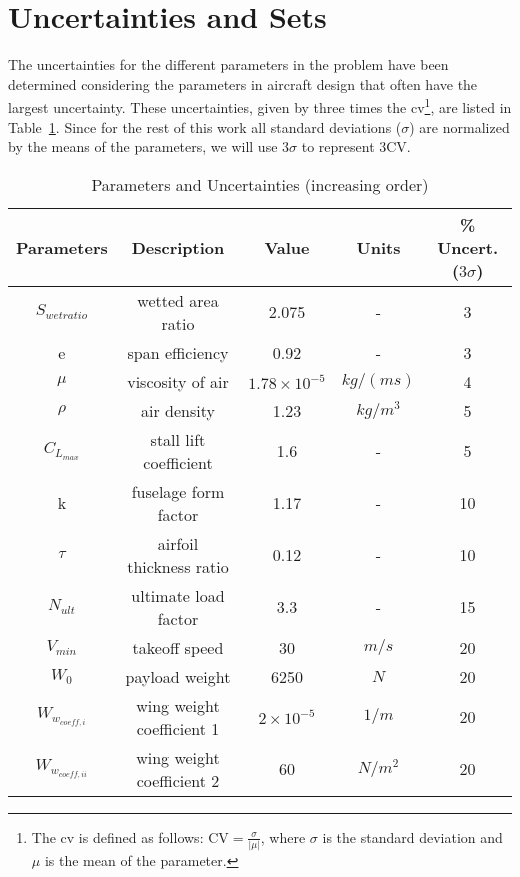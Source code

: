 \section{Uncertainties and Sets}
\label{uncertainties_and_sets}

The uncertainties for the different parameters in the problem have been determined
considering the parameters in aircraft design that often have the largest uncertainty.
These uncertainties, given by three times the \gls{cv}\footnote{The \gls{cv}
is defined as follows: $\text{CV} = \frac{\sigma}{|\mu|}$, where $\sigma$ is the standard deviation and $\mu$ is the mean of the parameter.},
are listed in Table~\ref{tab:uncertainties}. Since for the rest of this work
all standard deviations ($\sigma$) are normalized by the means of the parameters, we will use $3\sigma$
to represent $3\text{CV}$.

\begin{table}
\begin{center}
\caption{\label{tab:uncertainties} Parameters and Uncertainties (increasing order)}
\begin{tabular}{c c c c c}
\hline
Parameters & Description & Value & Units &\% Uncert. ($3\sigma$) \\
\hline
$S_{wetratio}$ & wetted area ratio & 2.075 & - & 3\\
e & span efficiency & 0.92 & - & 3\\
$\mu$ & viscosity of air & $1.78 \times 10^{-5}$ & $kg/(ms)$ & 4 \\
$\rho$ & air density & 1.23 & $kg/m^3$ & 5 \\
$C_{L_{max}}$ & stall lift coefficient & 1.6 & - & 5\\
k & fuselage form factor & 1.17 & - & 10\\
$\tau$ & airfoil thickness ratio & 0.12 & - & 10\\
$N_{ult}$ & ultimate load factor & 3.3 & - & 15\\
$V_{min}$ & takeoff speed & 30 & $m/s$ & 20\\
$W_0$ & payload weight & 6250 & $N$ & 20\\
$W_{w_{coeff,i}}$ & wing weight coefficient 1 & $2 \times 10^{-5}$ & $1/m$ & 20\\
$W_{w_{coeff,ii}}$ & wing weight coefficient 2 & 60 & $N/m^2$ & 20\\
\hline
\end{tabular}
\end{center}
\end{table}

